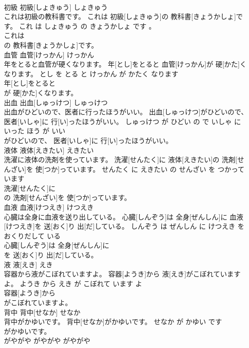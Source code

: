 \documentclass[8pt]{extreport}
\begin{document}
\begin{CJK}{UTF8}{min}
\\	初級	初級[しょきゅう]	しょきゅう	
\\	これは初級の教科書です。	これは 初級[しょきゅう]の 教科書[きょうかしょ]です。	これ は しょきゅう の きょうかしょ です 。	
\\	これは
\\	の 教科書[きょうかしょ]です。			
\\	血管	血管[けっかん]	けっかん	
\\	年をとると血管が硬くなります。	年[とし]をとると 血管[けっかん]が 硬[かた]くなります。	とし を とる と けっかん が かたく なります	
\\	年[とし]をとると
\\	が 硬[かた]くなります。			
\\	出血	出血[しゅっけつ]	しゅっけつ	
\\	出血がひどいので、医者に行ったほうがいい。	出血[しゅっけつ]がひどいので、 医者[いしゃ]に 行[い]ったほうがいい。	しゅっけつ が ひどい の で いしゃ に いった ほう が いい	
\\	がひどいので、 医者[いしゃ]に 行[い]ったほうがいい。			
\\	液体	液体[えきたい]	えきたい	
\\	洗濯に液体の洗剤を使っています。	洗濯[せんたく]に 液体[えきたい]の 洗剤[せんざい]を 使[つか]っています。	せんたく に えきたい の せんざい を つかって います	
\\	洗濯[せんたく]に
\\	の 洗剤[せんざい]を 使[つか]っています。			
\\	血液	血液[けつえき]	けつえき	
\\	心臓は全身に血液を送り出している。	心臓[しんぞう]は 全身[ぜんしん]に 血液[けつえき]を 送[おく]り 出[だ]している。	しんぞう は ぜんしん に けつえき を おくりだして いる	
\\	心臓[しんぞう]は 全身[ぜんしん]に
\\	を 送[おく]り 出[だ]している。			
\\	液	液[えき]	えき	
\\	容器から液がこぼれていますよ。	容器[ようき]から 液[えき]がこぼれていますよ。	ようき から えき が こぼれて います よ	
\\	容器[ようき]から
\\	がこぼれていますよ。			
\\	背中	背中[せなか]	せなか	
\\	背中がかゆいです。	背中[せなか]がかゆいです。	せなか が かゆい です	
\\	がかゆいです。			
\\	がやがや	がやがや	がやがや	

\end{CJK}
\end{document}
